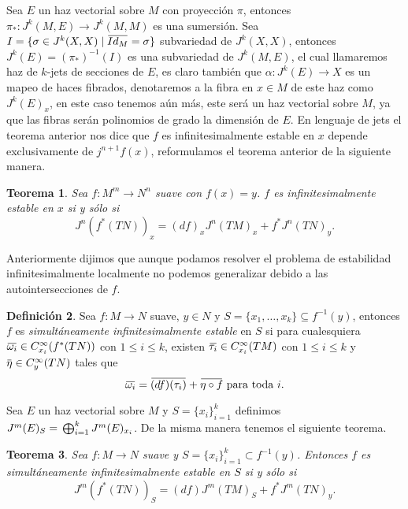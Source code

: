 \documentclass{report}
\newtheorem{theorem}{Teorema}[section]
\theoremstyle{definition}
\newtheorem{defi}[theorem]{Definici\'on}
\newcommand{\overbar}[1]{\mkern 1.5mu\overline{\mkern-1.5mu#1\mkern-1.5mu}\mkern 1.5mu}
\begin{document}
Sea $E$ un haz vectorial sobre $M$ con proyecci\'on $\pi$, entonces $\pi_\ast: J^k (M, E) \to  J^k (M,M)$ es una sumersi\'on. Sea $I = \{ \sigma \in J^k (X,X) \mid \overbar{Id_M} = \sigma \}$ subvariedad de $J^k (X,X)$, entonces $J^k(E) = (\pi_\ast)^{-1} (I)$ es una subvariedad de $J^k (M,E)$, el cual llamaremos haz de $k$-jets de secciones de $E$, es claro tambi\'en que $\alpha: J^k (E) \to X$ es un mapeo de haces fibrados, denotaremos a la fibra en $x \in M$ de este haz como $J^k (E)_x$, en este caso tenemos a\'un m\'as, este ser\'a un haz vectorial sobre $M$, ya que las fibras ser\'an polinomios de grado la dimensi\'on de $E$. En lenguaje de jets el teorema anterior nos dice que $f$ es infinitesimalmente estable en $x$ depende exclusivamente de $j^{n+1} f(x)$, reformulamos el teorema anterior de la siguiente manera.

\begin{theorem}
Sea $f: M^m \to N^n$ suave con $f(x) = y$. $f$ es infinitesimalmente estable en $x$ si y s\'olo si $$J^n(f^\ast (TN))_x = (df) _x J^n (TM)_x  + f^\ast J^n(TN)_y .$$
\end{theorem}

Anteriormente dijimos que aunque podamos resolver el problema de estabilidad infinitesimalmente localmente no podemos generalizar debido a las autointersecciones de $f$.

\begin{defi} 
Sea $f: M \to N$ suave, $y \in N$ y $S = \{x_1, \dots , x_k \}\subseteq f^{-1} (y)$, entonces $f$ es \textit{simult\'aneamente infinitesimalmente estable} en $S$ si para cualesquiera $\overbar{\omega_i} \in C^\infty_{x_i} (f^\ast (TN))$ con $1 \leq i \leq k$, existen $\overbar{\tau_i} \in C^\infty_{x_i} (TM)$ con $1 \leq i \leq k$ y $\overbar{\eta} \in C^\infty_y (TN)$ tales que $$\overbar{\omega_i} = \overbar{(df)(\tau_i)} + \overbar{\eta \circ f} \text{ para toda } i.$$
\end{defi}

Sea $E$ un haz vectorial sobre $M$ y $S= \{ x_i \}_{i=1}^k$ definimos $J^m (E)_S = \\ \bigoplus_{i=1}^k J^m(E)_{x_i}$. De la misma manera tenemos el siguiente teorema.

\begin{theorem}
Sea $f:M \to N$ suave y $S = \{ x_i \}_{i=1}^k \subset f^{-1} (y)$. Entonces $f$ es simult\'aneamente infinitesimalmente estable en $S$ si y s\'olo si $$J^m (f^\ast (TN))_S = (df)J^m(TM)_S + f^\ast J^m (TN)_y .$$
\end{theorem}
\end{document}
